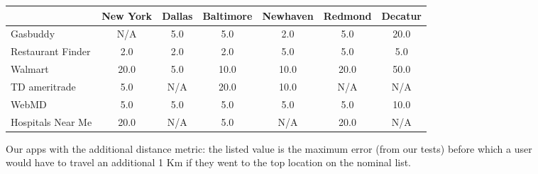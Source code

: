 \begin{figure*}
 \small
 \centering
 \begin{tabular}{|l||c|c|c|c|c|c|}
 \hline
 & New York & Dallas & Baltimore & Newhaven & Redmond & Decatur \\
 \hline
 \hline
 Gasbuddy & N/A & 5.0 & 5.0 & 2.0 & 5.0 & 20.0 \\
\hline
Restaurant Finder & 2.0 & 2.0 & 2.0 & 5.0 & 5.0 & 5.0 \\
\hline
Walmart & 20.0 & 5.0 & 10.0 & 10.0 & 20.0 & 50.0 \\
\hline
TD ameritrade & 5.0 & N/A & 20.0 & 10.0 & N/A & N/A \\
\hline
WebMD & 5.0 & 5.0 & 5.0 & 5.0 & 5.0 & 10.0 \\
\hline
Hospitals Near Me & 20.0 & N/A & 5.0 & N/A & 20.0 & N/A \\
\hline

\end{tabular}
 \caption{Our apps with the additional distance metric: the listed value is the maximum error
(from our tests) before which a user would have to travel an additional 1 Km if they went to the top location on the nominal list.}
 \label{fig:knee-points-additional-cutoff}
\end{figure*}

